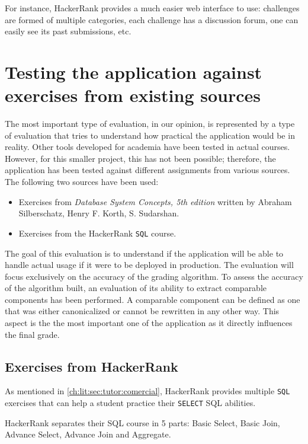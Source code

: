 For instance, HackerRank provides a much easier web interface to use: challenges are formed of multiple categories, each challenge has a discussion forum, one can easily see its past submissions, etc.

\section{Testing the application against exercises from existing sources}
The most important type of evaluation, in our opinion, is represented by a type of evaluation that tries to understand how practical the application would be in reality. Other tools developed for academia have been tested in actual courses. However, for this smaller project, this has not been possible; therefore, the application has been tested against different assignments from various sources. The following two sources have been used:

\begin{itemize}
    \item Exercises from \textit{Database System Concepts, 5th edition} written by Abraham Silberschatz, Henry F. Korth, S. Sudarshan.
    \item Exercises from the HackerRank \texttt{SQL} course.
\end{itemize}

The goal of this evaluation is to understand if the application will be able to handle actual usage if it were to be deployed in production. The evaluation will focus exclusively on the accuracy of the grading algorithm. To assess the accuracy of the algorithm built, an evaluation of its ability to extract comparable components has been performed. A comparable component can be defined as one that was either canonicalized or cannot be rewritten in any other way. This aspect is the the most important one of the application as it directly influences the final grade.

\subsection{Exercises from HackerRank}

As mentioned in \ref{ch:lit:sec:tutor:comercial}, HackerRank provides multiple \texttt{SQL} exercises that can help a student practice their \texttt{SELECT} SQL abilities.

HackerRank separates their SQL course in 5 parts: Basic Select, Basic Join, Advance Select, Advance Join and Aggregate.

